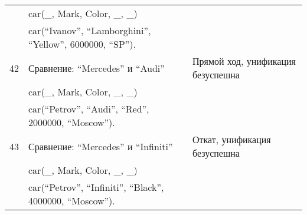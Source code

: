 {\begin{longtable}{|p{1.15cm}|p{8cm}|p{8cm}|}
       & car(\_, Mark, Color, \_, \_) & \\
       & car(``Ivanov'', ``Lamborghini'', ``Yellow'', 6000000, ``SP''). & \\
    \hline
    42 & Сравнение: ``Mercedes'' и ``Audi'' & Прямой ход, унификация безуспешна \\
       & car(\_, Mark, Color, \_, \_) & \\
       & car(``Petrov'', ``Audi'', ``Red'', 2000000, ``Moscow''). & \\
    \hline
    43 & Сравнение: ``Mercedes'' и ``Infiniti'' & Откат, унификация безуспешна \\
       & car(\_, Mark, Color, \_, \_) & \\
       & car(``Petrov'', ``Infiniti'', ``Black'', 4000000, ``Moscow''). & \\
    \hline
\end{longtable}
}

